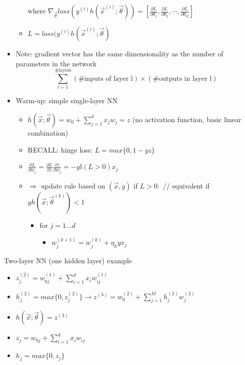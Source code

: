\documentclass[10pt, oneside]{article}
\begin{document}
\begin{itemize}
\begin{itemize}
        where $\nabla_{\vec \theta} loss(y^{(i)} h(\vec x^{(i)}; \vec \theta)) = [\frac{\partial L}{\partial \theta_1},\frac{\partial L}{\partial \theta_2},\cdots, \frac{\partial L}{\partial \theta_D}]$
        \item $L = loss(y^{(i)} h(\vec x^{(i)}; \vec \theta)$
    \end{itemize}
    \item Note: gradient vector has the same dimensionality as the number of parameters in the network
    \[\sum_{l=1}^{\text{\# layers}} (\text{\# inputs of layer l}) \times (\text{\# outputs in layer l})\]
    \item Warm-up: simple single-layer NN
    \begin{itemize}
        \item $h(\vec x; \vec \theta) = w_0 + \sum_{j=1}^d x_j w_j = z$ (no activation function, basic linear combination)
        \item RECALL: hinge loss: $L = max\{0, 1-yz\}$
        \item $\frac{\partial L}{\partial w_j} = 
        \frac{\partial L}{\partial z}
        \frac{\partial z}{\partial w_j} = -y \mathbb{I} (L>0) x_j$
        \item $\Rightarrow$ update rule based on $(\vec x, y)$
             if $L>0:$ // equivalent if $yh(\vec x;\vec \theta^{(k)} ) < 1$ 
             \begin{itemize}
                 \item for $j=1...d$\\
                 \begin{itemize}
                     \item $w_j^{(k+1)} = w_j ^{(k)} + \eta_k yx_j$
                \end{itemize}
             \end{itemize}
    \end{itemize}
\end{itemize}
Two-layer NN (one hidden layer) example
\begin{itemize}
    \item $z_j^{(2)} = w_{0j}^{(1)} + \sum_{i=1}^d x_i w_{ij}^{(1)}$
    \item $h_j^{(2)} = max\{0, z_j^{(2)}\} \rightarrow z^{(3)} = w_0 ^{(2)} + \sum_{j=1}^M h_j ^{(2)} w_j^{(2)}$
    \item $h(\vec x; \vec \theta) = z^{(3)}$
    \item $z_j = w_{0j} + \sum_{i=1}^d x_i w_{ij}$
    \item $h_j = max\{0, z_j\}$
\end{itemize}
\end{document}
